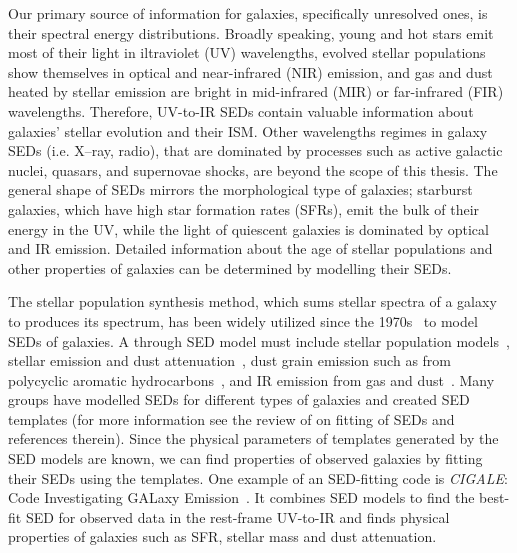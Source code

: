 Our primary source of information for galaxies, specifically unresolved ones, is their spectral energy distributions. %
Broadly speaking, young and hot stars emit most of their light in iltraviolet (UV) wavelengths, evolved stellar populations show themselves in optical and near-infrared (NIR) emission, and gas and dust heated by stellar emission are bright in mid-infrared (MIR) or far-infrared (FIR) wavelengths.
Therefore, UV-to-IR SEDs contain valuable information about galaxies' stellar evolution and their ISM. 
Other wavelengths regimes in galaxy SEDs (i.e. X--ray, radio), that are dominated by processes such as active galactic nuclei, quasars, and supernovae shocks, are beyond the scope of this thesis.
The general shape of SEDs mirrors the morphological type of galaxies; starburst galaxies, which have high star formation rates (SFRs), emit the bulk of their energy in the UV, while the light of quiescent galaxies is dominated by optical and IR emission. 
Detailed information about the age of stellar populations and other properties of galaxies can be determined by modelling their SEDs.

The stellar population synthesis method, which sums stellar spectra of a galaxy to produces its spectrum, has been widely utilized since the 1970s~\citep[e.g.][]{Tinsley72,Searle73} to model SEDs of galaxies.
A through SED model must include stellar population models~\citep[e.g.][]{Bruzual93,Bruzual03,Maraston05}, stellar emission and dust attenuation~\citep[e.g.][]{Calzetti00,Dopita05}, dust grain emission such as from polycyclic aromatic hydrocarbons~\citep[PAHs; e.g.][and references therein]{Tielens08}, and IR emission from gas and dust~\citep[e.g.][]{Chary01,Dale02,Lagache03,Lagache04,Smith07a,Draine07}.%
Many groups have modelled SEDs for different types of galaxies and created SED templates (for more information see the review of \cite{Walcher11} on fitting of SEDs and references therein).
Since the physical parameters of templates generated by the SED models are known, we can find properties of observed galaxies by fitting their SEDs using the templates.
One example of an SED-fitting code is {\em CIGALE}: Code Investigating GALaxy Emission~\citep{Noll09}.
It combines SED models to find the best-fit SED for observed data in the rest-frame UV-to-IR and finds physical properties of galaxies such as SFR, stellar mass and dust attenuation.

